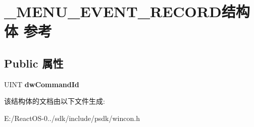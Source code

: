 \hypertarget{struct___m_e_n_u___e_v_e_n_t___r_e_c_o_r_d}{}\section{\+\_\+\+M\+E\+N\+U\+\_\+\+E\+V\+E\+N\+T\+\_\+\+R\+E\+C\+O\+R\+D结构体 参考}
\label{struct___m_e_n_u___e_v_e_n_t___r_e_c_o_r_d}
\subsection*{Public 属性}
\begin{DoxyCompactItemize}
\item 
\mbox{\label{struct___m_e_n_u___e_v_e_n_t___r_e_c_o_r_d_a879d24b811294870bfbeff846819319d}} 
U\+I\+NT {\bfseries dw\+Command\+Id}
\end{DoxyCompactItemize}


该结构体的文档由以下文件生成\+:\begin{DoxyCompactItemize}
\item 
E\+:/\+React\+O\+S-\/0../sdk/include/psdk/wincon.\+h\end{DoxyCompactItemize}
